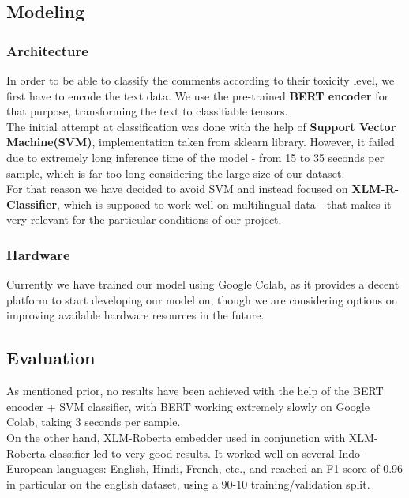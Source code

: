 \documentclass[]{article}
\begin{document}
	\subsection{Modeling}
	
	\subsubsection{Architecture}
	
	In order to be able to classify the comments according to their toxicity level, we first have to encode the text data. We use the pre-trained \textbf{BERT encoder} for that purpose, transforming the text to classifiable tensors. \\
	
	The initial attempt at classification was done with the help of \textbf{Support Vector Machine(SVM)}, implementation taken from sklearn library. However, it failed due to extremely long inference time of the model - from 15 to 35 seconds per sample, which is far too long considering the large size of our dataset.\\
	
	For that reason we have decided to avoid SVM and instead focused on \textbf{XLM-R-Classifier}, which is supposed to work well on multilingual data - that makes it very relevant for the particular conditions of our project.
	
	\subsubsection{Hardware}
	
	Currently we have trained our model using Google Colab, as it provides a decent platform to start developing our model on, though we are considering options on improving available hardware resources in the future.
	
	\subsection{Evaluation}
	
	As mentioned prior, no results have been achieved with the help of the BERT encoder + SVM classifier, with BERT working extremely slowly on Google Colab, taking 3 seconds per sample. \\
	On the other hand, XLM-Roberta embedder used in conjunction with XLM-Roberta classifier led to very good results. It worked well on several Indo-European languages: English, Hindi, French, etc., and reached an F1-score of 0.96 in particular on the english dataset, using a 90-10 training/validation split.
	
\end{document}

